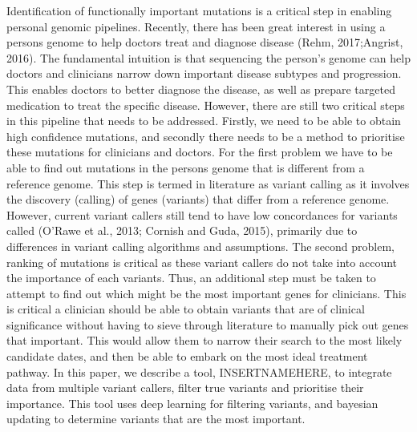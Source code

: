 \documentclass{article}
\begin{document}
Identification of functionally important mutations is a critical step in enabling personal genomic pipelines. Recently, there has been great interest in using a persons genome to help doctors treat and diagnose disease (Rehm, 2017;Angrist, 2016). The fundamental intuition is that sequencing the person's genome can help doctors and clinicians narrow down important disease subtypes and progression. This enables doctors to better diagnose the disease, as well as prepare targeted medication to treat the specific disease. However, there are still two critical steps in this pipeline that needs to be addressed. Firstly, we need to be able to obtain high confidence mutations, and secondly there needs to be a method to prioritise these mutations for clinicians and doctors. For the first problem we have to be able to find out mutations in the persons genome that is different from a reference genome. This step is termed in literature as variant calling as it involves the discovery (calling) of genes (variants) that differ from a reference genome. However, current variant callers still tend to have low concordances for variants called (O'Rawe et al., 2013; Cornish and Guda, 2015), primarily due to differences in variant calling algorithms and assumptions. The second problem, ranking of mutations is critical as these variant callers do not take into account the importance of each variants. Thus, an additional step must be taken to attempt to find out which might be the most important genes for clinicians. This is critical a clinician should be able to obtain variants that are of clinical significance without having to sieve through literature to manually pick out genes that important. This would allow them to narrow their search to the most likely candidate dates, and then be able to embark on the most ideal treatment pathway. In this paper, we describe a tool, INSERTNAMEHERE, to integrate data from multiple variant callers, filter true variants and prioritise their importance. This tool uses deep learning for filtering variants, and bayesian updating to determine variants that are the most important.\\
\end{document}
